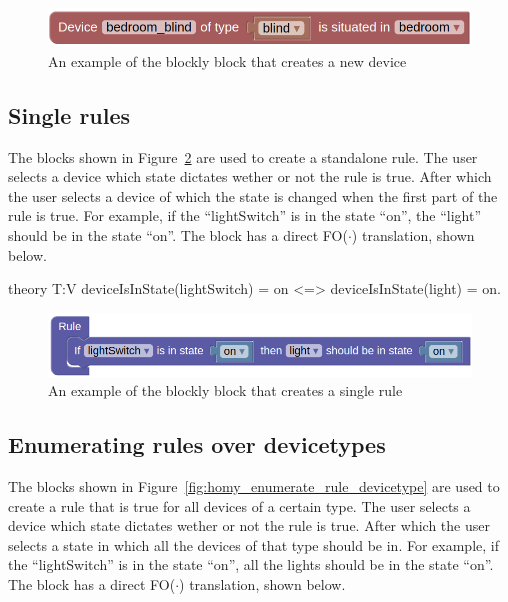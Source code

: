 \documentclass[11pt,a4paper]{report}
\newcommand{\fodot}{FO($\cdot$)\xspace}
\begin{document}
\begin{figure}
    \centering
    \includegraphics[width=0.8\linewidth]{images/homy_device.png}
    \caption{An example of the blockly block that creates a new device}
    \label{fig:homy_device}
\end{figure}

\subsection{Single rules}
The blocks shown in Figure~\ref{fig:homy_single_rule} are used to create a standalone rule. The user selects a device which state dictates wether or not the rule is true. After which the user selects a device of which the state is changed when the first part of the rule is true. For example, if the ``lightSwitch'' is in the state ``on'', the ``light'' should be in the state ``on''. The block has a direct \fodot translation, shown below.

\begin{idplisting}
theory T:V {
    deviceIsInState(lightSwitch) = on <=> deviceIsInState(light) = on.
}
\end{idplisting}

\begin{figure}
    \centering
    \includegraphics[width=0.8\linewidth]{images/homy_single_rule.png}
    \caption{An example of the blockly block that creates a single rule}
    \label{fig:homy_single_rule}
\end{figure}

\subsection{Enumerating rules over devicetypes}
The blocks shown in Figure~\ref{fig:homy_enumerate_rule_devicetype} are used to create a rule that is true for all devices of a certain type. The user selects a device which state dictates wether or not the rule is true. After which the user selects a state in which all the devices of that type should be in. For example, if the ``lightSwitch'' is in the state ``on'', all the lights should be in the state ``on''. The block has a direct \fodot translation, shown below.
\end{document}

